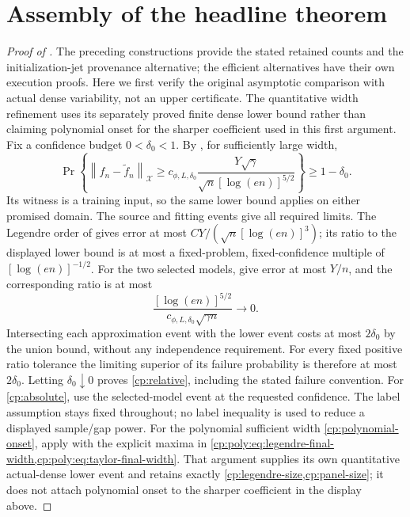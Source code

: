 \documentclass[11pt]{article}
\theoremstyle{definition}
\theoremstyle{remark}
\newcommand{\norm}[1]{\left\lVert#1\right\rVert}
\begin{document}








\section{Assembly of the headline theorem}
\label{cp:assembly}
\begin{proof}[Proof of ]
The preceding constructions provide the stated retained counts and the
initialization-jet provenance alternative; the efficient alternatives have
their own execution proofs. Here we first verify the original asymptotic
comparison with actual dense variability, not an upper certificate. The
quantitative width refinement uses its separately proved finite dense lower
bound rather than claiming polynomial onset for the sharper coefficient
used in this first argument.
Fix a confidence budget $0<\delta_0<1$. By , for
sufficiently large width,
\[
 \Pr\left\{\norm{f_n-\widetilde f_n}_{\mathcal X}
 \ge c_{\phi,L,\delta_0}
       \frac{Y\sqrt\gamma}{\sqrt n[\log(en)]^{5/2}}\right\}
 \ge1-\delta_0.
\]
Its witness is a training input, so the same lower bound applies on either
promised domain. The source and fitting events give all required limits.
The Legendre order of  gives error at most
$CY/(\sqrt n[\log(en)]^3)$; its ratio to the displayed lower bound is
at most a fixed-problem, fixed-confidence multiple of
$[\log(en)]^{-1/2}$. For the two selected models,
 give error at most $Y/n$, and the corresponding
ratio is at most
\[
 \frac{[\log(en)]^{5/2}}
 {c_{\phi,L,\delta_0}\sqrt{\gamma n}}\longrightarrow0.
\]
Intersecting each approximation event with the lower event costs at most
$2\delta_0$ by the union bound, without any independence requirement.
For every fixed positive ratio tolerance the limiting superior of its failure
probability is therefore at most $2\delta_0$. Letting $\delta_0\downarrow0$
proves \eqref{cp:relative}, including the stated failure convention.
For \eqref{cp:absolute}, use the selected-model event at the requested
confidence. The label assumption stays fixed throughout; no label inequality
is used to reduce a displayed sample/gap power.
For the polynomial sufficient width \eqref{cp:polynomial-onset}, apply
 with the explicit maxima in
\cref{cp:poly:eq:legendre-final-width,cp:poly:eq:taylor-final-width}.
That argument supplies its own quantitative actual-dense lower event and
retains exactly \cref{cp:legendre-size,cp:panel-size}; it does not attach
polynomial onset to the sharper coefficient in the display above.
\end{proof}







\end{document}
